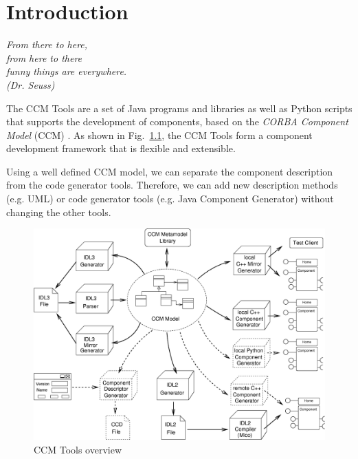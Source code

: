 
\chapter{Introduction}
\begin{flushright}
{\it From there to here, \\
     from here to there \\
     funny things are everywhere.\\
		(Dr. Seuss)}
\end{flushright}

The CCM Tools are a set of Java programs and libraries as well as Python scripts
that supports the development of components, based on the {\it CORBA Component
Model} (CCM) \cite{CCMSpecification}. As shown in Fig.~\ref{ccmtools}, the CCM
Tools form a component development framework that is flexible and extensible.

Using a well defined CCM model, we can separate the component description from
the code generator tools. Therefore, we can add new description methods (e.g.
UML) or code generator tools (e.g. Java Component Generator) without changing
the other tools.

\begin{figure}[htbp]
    \begin{center}
        \includegraphics [width=12cm,angle=0] {ComponentGeneratorTools}
        \caption{CCM Tools overview}
        \label{ccmtools}
    \end{center}
\end{figure}

